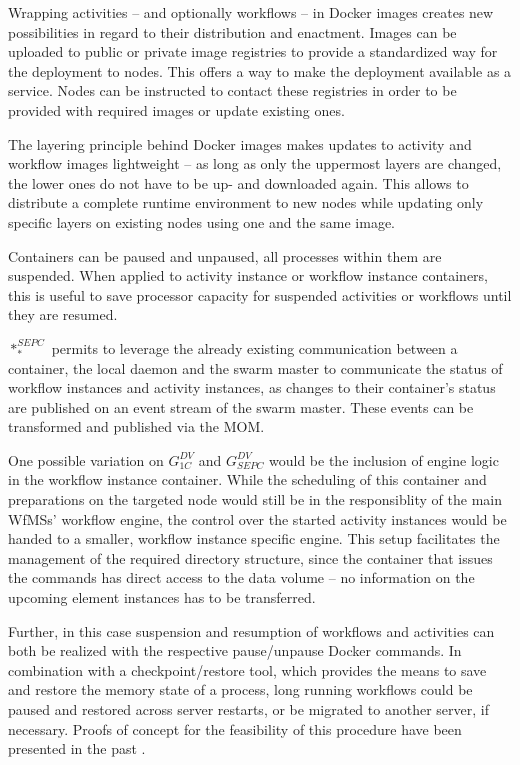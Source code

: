     Wrapping activities -- and optionally workflows -- in Docker images creates new possibilities in regard to their distribution and enactment. Images can be uploaded to public or private image registries to provide a standardized way for the deployment to nodes. This offers a way to make the deployment available as a service. Nodes can be instructed to contact these registries in order to be provided with required images or update existing ones.

    The layering principle behind Docker images makes updates to activity and workflow images lightweight -- as long as only the uppermost layers are changed, the lower ones do not have to be up- and downloaded again. This allows to distribute a complete runtime environment to new nodes while updating only specific layers on existing nodes using one and the same image.

    Containers can be paused and unpaused, \ie all processes within them are suspended. When applied to activity instance or workflow instance containers, this is useful to save processor capacity for suspended activities or workflows until they are resumed.

    $*_{*}^{SEPC}$ permits to leverage the already existing communication between a container, the local daemon and the swarm master to communicate the status of workflow instances and activity instances, as changes to their container's status are published on an event stream of the swarm master. These events can be transformed and published via the \ac{MOM}.

    One possible variation on $G_{1C}^{DV}$ and $G_{SEPC}^{DV}$ would be the inclusion of engine logic in the workflow instance container. While the scheduling of this container and preparations on the targeted node would still be in the responsiblity of the main \acp{WfMS}' workflow engine, the control over the started activity instances would be handed to a smaller, workflow instance specific engine.
    This setup facilitates the management of the required directory structure, since the container that issues the commands has direct access to the data volume -- no information on the upcoming element instances has to be transferred.

    Further, in this case suspension and resumption of workflows and activities can both be realized with the respective pause/unpause Docker commands. In combination with a checkpoint/restore tool, which provides the means to save and restore the memory state of a process, long running workflows could be paused and restored across server restarts, or be migrated to another server, if necessary. Proofs of concept for the feasibility of this procedure have been presented in the past \cite{Kim2015Checkpoint,Merker2015How}.

